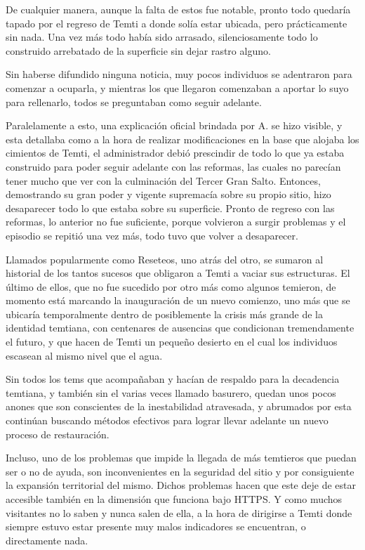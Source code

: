 \documentclass[
  spanish,
]{book}
\begin{document}
De cualquier manera, aunque la falta de estos fue notable, pronto todo quedaría tapado por el regreso de Temti a donde solía estar ubicada, pero prácticamente sin nada. Una vez más todo había sido arrasado, silenciosamente todo lo construido arrebatado de la superficie sin dejar rastro alguno.

Sin haberse difundido ninguna noticia, muy pocos individuos se adentraron para comenzar a ocuparla, y mientras los que llegaron comenzaban a aportar lo suyo para rellenarlo, todos se preguntaban como seguir adelante.

Paralelamente a esto, una explicación oficial brindada por A. se hizo visible, y esta detallaba como a la hora de realizar modificaciones en la base que alojaba los cimientos de Temti, el administrador debió prescindir de todo lo que ya estaba construido para poder seguir adelante con las reformas, las cuales no parecían tener mucho que ver con la culminación del Tercer Gran Salto. Entonces, demostrando su gran poder y vigente supremacía sobre su propio sitio, hizo desaparecer todo lo que estaba sobre su superficie. Pronto de regreso con las reformas, lo anterior no fue suficiente, porque volvieron a surgir problemas y el episodio se repitió una vez más, todo tuvo que volver a desaparecer.

Llamados popularmente como Reseteos, uno atrás del otro, se sumaron al historial de los tantos sucesos que obligaron a Temti a vaciar sus estructuras. El último de ellos, que no fue sucedido por otro más como algunos temieron, de momento está marcando la inauguración de un nuevo comienzo, uno más que se ubicaría temporalmente dentro de posiblemente la crisis más grande de la identidad temtiana, con centenares de ausencias que condicionan tremendamente el futuro, y que hacen de Temti un pequeño desierto en el cual los individuos escasean al mismo nivel que el agua.

Sin todos los tems que acompañaban y hacían de respaldo para la decadencia temtiana, y también sin el varias veces llamado basurero, quedan unos pocos anones que son conscientes de la inestabilidad atravesada, y abrumados por esta continúan buscando métodos efectivos para lograr llevar adelante un nuevo proceso de restauración.

Incluso, uno de los problemas que impide la llegada de más temtieros que puedan ser o no de ayuda, son inconvenientes en la seguridad del sitio y por consiguiente la expansión territorial del mismo. Dichos problemas hacen que este deje de estar accesible también en la dimensión que funciona bajo HTTPS. Y como muchos visitantes no lo saben y nunca salen de ella, a la hora de dirigirse a Temti donde siempre estuvo estar presente muy malos indicadores se encuentran, o directamente nada.
\end{document}
